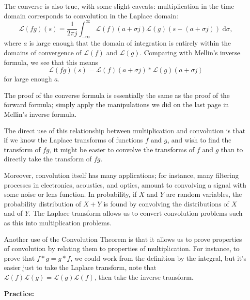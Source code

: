 \documentclass{article}
\newcommand{\diff}{\;\mathrm{d}}
\begin{document}
The converse is also true, with some slight caveats: multiplication in the time domain corresponds to convolution in the Laplace domain:
\[\mathcal{L}(fg)(s)=\frac{1}{2\pi j}\int_{-\infty}^\infty \mathcal{L}(f)(a+\sigma j) \mathcal{L}(g)(s-(a+\sigma j))\diff \sigma,\]
where $a$ is large enough that the domain of integration is entirely within the domains of convergence of $\mathcal{L}(f)$ and $\mathcal{L}(g)$. Comparing with Mellin's inverse formula, we see that this means
\[\mathcal{L}(fg)(s)=\mathcal{L}(f)(a+\sigma j)\ast\mathcal{L}(g)(a+\sigma j)\]
for large enough $a$.

The proof of the converse formula is essentially the same as the proof of the forward formula; simply apply the manipulations we did on the last page in Mellin's inverse formula.\bigskip


The direct use of this relationship between multiplication and convolution is that if we know the Laplace transforms of functions $f$ and $g$, and wish to find the transform of $fg$, it might be easier to convolve the transforms of $f$ and $g$ than to directly take the transform of $fg$.

Moreover, convolution itself has many applications; for instance, many filtering processes in electronics, acoustics, and optics, amount to convolving a signal with some noise or lens function. In probability, if $X$ and $Y$ are random variables, the probability distribution of $X+Y$ is found by convolving the distributions of $X$ and of $Y$. The Laplace transform allows us to convert convolution problems such as this into multiplication problems.\bigskip


Another use of the Convolution Theorem is that it allows us to prove properties of convolution by relating them to properties of multiplication. For instance, to prove that $f\ast g=g\ast f$, we could work from the definition by the integral, but it's easier just to take the Laplace transform, note that $\mathcal{L}(f)\mathcal{L}(g)=\mathcal{L}(g)\mathcal{L}(f)$, then take the inverse transform.






\clearpage



\textbf{Practice:}\bigskip
\end{document}
